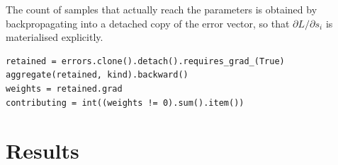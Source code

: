 \documentclass[12pt]{article}
\begin{document}
The count of samples that actually reach the parameters is obtained by backpropagating into a detached copy of the error vector, so that $\partial L / \partial s_i$ is materialised explicitly.

\begin{lstlisting}
retained = errors.clone().detach().requires_grad_(True)
aggregate(retained, kind).backward()
weights = retained.grad
contributing = int((weights != 0).sum().item())
\end{lstlisting}

\section{Results}

\begin{table}[H]
\centering

\caption{Experiment 1. Final epoch values on clean data with batch size 64. The last column is the first epoch at which test accuracy reaches 80 percent, and NR means the threshold was never reached within 5 epochs.}
\end{table}

\begin{table}[H]
\centering

\caption{Experiments 2 and 3. Final test accuracy on the clean test set after training on corrupted data, with the degradation measured in percentage points against the clean baseline of the same loss.}
\end{table}

\begin{table}[H]
\centering

\caption{Experiment 4. Effect of multiplying the squared errors of 2 samples out of a batch of 64 by a factor of 100.}
\end{table}

\begin{table}[H]
\centering

\caption{Experiment 5. Gradient behaviour on one batch of 64 at initialization. The last column counts the entries of the batch with a nonzero $\partial L / \partial s_i$.}
\end{table}

\begin{table}[H]
\centering

\caption{Experiment 6. Effect of batch size on clean data. The gradient norm is averaged over all optimizer steps of the run.}
\end{table}

\begin{table}[H]
\centering
\small

\caption{Summary of all six experiments.}
\end{table}
\end{document}
